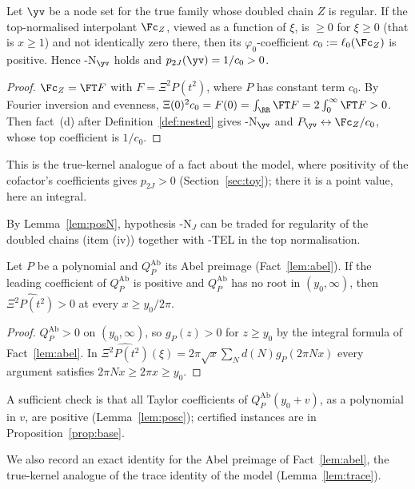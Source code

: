 \begin{lemma}\label{lem:posN}
Let $\yv$ be a node set for the true family whose doubled chain $Z$ is regular. If the top-normalised interpolant
$\Fc_Z$, viewed as a function of $\xi$, is $\ge0$ for $\xi\ge0$ (that is $x\ge1$) and not identically zero there,
then its $\varphi_0$-coefficient $c_0:=\ell_0(\Fc_Z)$ is positive. Hence \hyp{N}$_{\yv}$ holds and
$p_{2J}(\yv)=1/c_0>0$.
\end{lemma}

\begin{proof}
$\Fc_Z=\FT F$ with $F=\Xi^2P(t^2)$, where $P$ has constant term $c_0$. By Fourier inversion and evenness,
$\Xi(0)^2c_0=F(0)=\int_\RR\FT F=2\int_0^\infty\FT F>0$. Then fact~(d) after Definition~\ref{def:nested} gives
\hyp{N}$_{\yv}$ and $P_{\yv}\leftrightarrow\Fc_Z/c_0$, whose top coefficient is $1/c_0$.
\end{proof}

This is the true-kernel analogue of a fact about the model, where positivity of the cofactor's coefficients gives
$p_{2J}>0$ (Section~\ref{sec:toy}); there it is a point value, here an integral.

By Lemma~\ref{lem:posN}, hypothesis \hyp{N}$_J$ can be traded for regularity of the doubled chains (item (iv)) together
with \hyp{TEL} in the top normalisation.

\begin{lemma}\label{lem:BF}
Let $P$ be a polynomial and $Q^{\mathrm{Ab}}_P$ its Abel preimage (Fact~\ref{lem:abel}). If the leading coefficient
of $Q^{\mathrm{Ab}}_P$ is positive and $Q^{\mathrm{Ab}}_P$ has no root in $(y_0,\infty)$, then
$\widehat{\Xi^2P(t^2)}>0$ at every $x\ge y_0/2\pi$.
\end{lemma}

\begin{proof}
$Q^{\mathrm{Ab}}_P>0$ on $(y_0,\infty)$, so $g_P(z)>0$ for $z\ge y_0$ by the integral formula of Fact~\ref{lem:abel}. In
$\widehat{\Xi^2P(t^2)}(\xi)=2\pi\sqrt x\sum_Nd(N)g_P(2\pi Nx)$ every argument satisfies $2\pi Nx\ge2\pi x\ge y_0$.
\end{proof}

A sufficient check is that all Taylor coefficients of $Q^{\mathrm{Ab}}_P(y_0+v)$, as a polynomial in $v$, are positive
(Lemma~\ref{lem:posc}); certified instances are in Proposition~\ref{prop:base}.

We also record an exact identity for the Abel preimage of Fact~\ref{lem:abel}, the true-kernel analogue of the trace
identity of the model (Lemma~\ref{lem:trace}).

